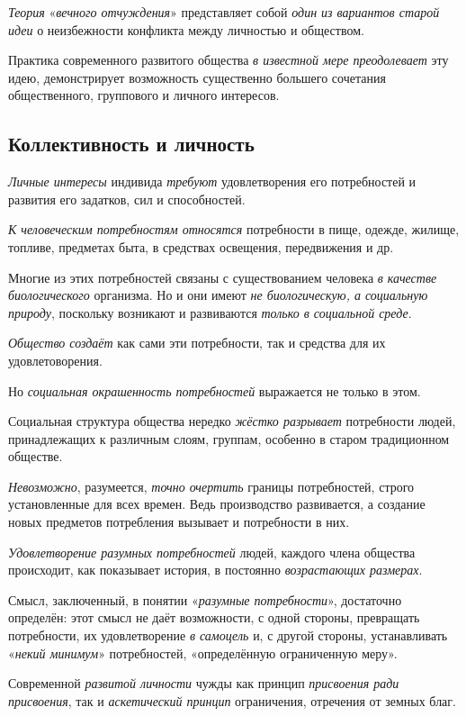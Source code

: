 \documentclass[a4paper,14pt,russian]{extreport}
\begin{document}
\emph{Теория} «\emph{вечного отчуждения}» представляет собой \emph{один из вариантов старой идеи} о неизбежности конфликта между личностью и обществом.

Практика современного развитого общества \emph{в известной мере преодолевает} эту идею, демонстрирует возможность существенно большего сочетания общественного, группового и личного интересов.

\subsection{Коллективность и личность}

\emph{Личные интересы} индивида \emph{требуют} удовлетворения его потребностей и развития его задатков, сил и способностей.

\emph{К человеческим потребностям относятся} потребности в пище, одежде, жилище, топливе, предметах быта, в средствах освещения, передвижения и др.

Многие из этих потребностей связаны с существованием человека \emph{в качестве биологического} организма. Но и они имеют \emph{не биологическую, а социальную природу}, поскольку возникают и развиваются \emph{только в социальной среде}.

\emph{Общество создаёт} как сами эти потребности, так и средства для их удовлетоворения.

Но \emph{социальная окрашенность потребностей} выражается не только в этом.

Социальная структура общества нередко \emph{жёстко разрывает} потребности людей, принадлежащих к различным слоям, группам, особенно в старом традиционном обществе.

\emph{Невозможно}, разумеется, \emph{точно очертить} границы потребностей, строго установленные для всех времен. Ведь производство развивается, а создание новых предметов потребления вызывает и потребности в них.

\emph{Удовлетворение разумных потребностей} людей, каждого члена общества происходит, как показывает история, в постоянно \emph{возрастающих размерах}.

Смысл, заключенный, в понятии «\emph{разумные потребности}», достаточно определён: этот смысл не даёт возможности, с одной стороны, превращать потребности, их удовлетворение \emph{в самоцель} и, с другой стороны, устанавливать «\emph{некий минимум}» потребностей, «определённую ограниченную меру».

Современной \emph{развитой личности} чужды как принцип \emph{присвоения ради присвоения}, так и \emph{аскетический принцип} ограничения, отречения от земных благ.
\end{document}
